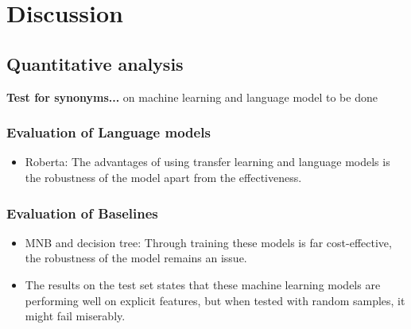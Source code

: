 \chapter{Discussion}

\section{Quantitative analysis}
\textbf{Test for synonyms...} on machine learning and language model to be done

\subsection{Evaluation of Language models}
\begin{itemize}
    \item Roberta: The advantages of using transfer learning and language models is the robustness of the model apart from the effectiveness.
\end{itemize}
\subsection{Evaluation of Baselines}
\begin{itemize}
    \item MNB and decision tree: Through training these models is far cost-effective, the robustness of the model remains an issue. 
    \item The results on the test set states that these machine learning models are performing well on explicit features, but when tested with random samples, it might fail miserably. 
\end{itemize}


